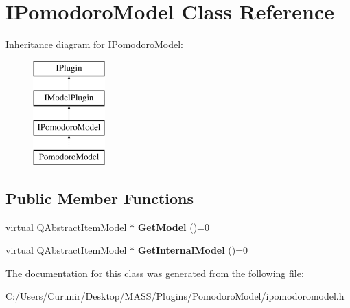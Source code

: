 \hypertarget{class_i_pomodoro_model}{}\section{I\+Pomodoro\+Model Class Reference}
\label{class_i_pomodoro_model}
Inheritance diagram for I\+Pomodoro\+Model\+:\begin{figure}[H]
\begin{center}
\leavevmode
\includegraphics[height=4.000000cm]{class_i_pomodoro_model}
\end{center}
\end{figure}
\subsection*{Public Member Functions}
\begin{DoxyCompactItemize}
\item 
\mbox{\label{class_i_pomodoro_model_a8de6ac3baca2a088fbaa6323fcfce4e0}} 
virtual Q\+Abstract\+Item\+Model $\ast$ {\bfseries Get\+Model} ()=0
\item 
\mbox{\label{class_i_pomodoro_model_a27a07cc7b6fa637a3de85338fc75696c}} 
virtual Q\+Abstract\+Item\+Model $\ast$ {\bfseries Get\+Internal\+Model} ()=0
\end{DoxyCompactItemize}


The documentation for this class was generated from the following file\+:\begin{DoxyCompactItemize}
\item 
C\+:/\+Users/\+Curunir/\+Desktop/\+M\+A\+S\+S/\+Plugins/\+Pomodoro\+Model/ipomodoromodel.\+h\end{DoxyCompactItemize}

